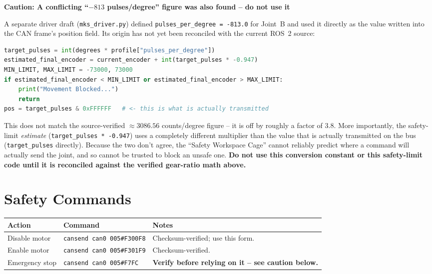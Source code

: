 \documentclass[11pt,letterpaper]{article}
\newenvironment{caution}[1]{%
    \par\addvspace{8pt}%
    \noindent{\color{cautionred}\rule{\linewidth}{0.8pt}}\par\vspace{2pt}
    \noindent\textbf{\color{cautionred}Caution: #1}\par\vspace{2pt}
}{%
    \par\vspace{2pt}\noindent{\color{cautionred}\rule{\linewidth}{0.4pt}}%
    \par\addvspace{8pt}%
}
\begin{document}
\begin{caution}{A conflicting ``$-813$ pulses/degree'' figure was also found -- do not use it}
A separate driver draft (\texttt{mks\_driver.py}) defined
\texttt{pulses\_per\_degree~=~-813.0} for Joint~B and used it directly as the
value written into the CAN frame's position field.  Its origin has not yet
been reconciled with the current ROS~2 source:
\begin{lstlisting}[language=python]
target_pulses = int(degrees * profile["pulses_per_degree"])
estimated_final_encoder = current_encoder + int(target_pulses * -0.947)
MIN_LIMIT, MAX_LIMIT = -73000, 73000
if estimated_final_encoder < MIN_LIMIT or estimated_final_encoder > MAX_LIMIT:
    print("Movement Blocked...")
    return
pos = target_pulses & 0xFFFFFF   # <- this is what is actually transmitted
\end{lstlisting}
This does not match the source-verified $\approx 3086.56$ counts/degree figure -- it is off by roughly a factor of 3.8. More importantly, the safety-limit \emph{estimate} (\texttt{target\_pulses~*~-0.947}) uses a completely different multiplier than the value that is actually transmitted on the bus (\texttt{target\_pulses} directly). Because the two don't agree, the ``Safety Workspace Cage'' cannot reliably predict where a command will actually send the joint, and so cannot be trusted to block an unsafe one. \textbf{Do not use this conversion constant or this safety-limit code until it is reconciled against the verified gear-ratio math above.}
\end{caution}

\newpage
\section{Safety Commands}
\label{sec:safety}

\begin{table}[h]
\centering
\begin{tabular}{lll}
\toprule
\textbf{Action} & \textbf{Command} & \textbf{Notes} \\ \midrule
Disable motor & \texttt{cansend can0 005\#F300F8} & Checksum-verified; use this form. \\
Enable motor & \texttt{cansend can0 005\#F301F9} & Checksum-verified. \\
Emergency stop & \texttt{cansend can0 005\#F7FC} & \textbf{Verify before relying on it -- see caution below.} \\ \bottomrule
\end{tabular}
\end{table}
\end{document}
